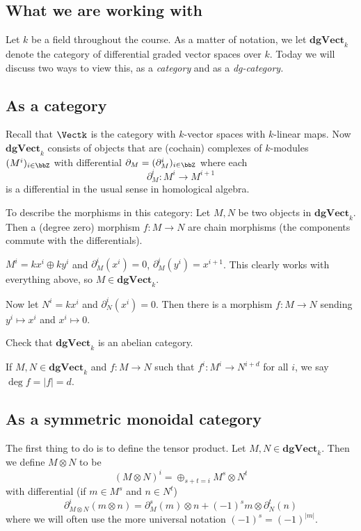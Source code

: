 \documentclass[12pt]{article}
\newcommand*{\dgVectk}{\mathbf{dgVect}_k}
\begin{document}
\subsection{What we are working with}
Let $k$ be a field throughout the course. As a matter of notation, we let $\dgVectk$
denote the category of differential graded vector spaces over $k$. Today we will discuss two ways to
view this, as a \textit{category} and as a \textit{dg-category.}

\subsection{As a category}
Recall that $\Vectk$ is the category with $k$-vector spaces with $k$-linear maps. Now $\dgVectk$ consists of
objects that are (cochain) complexes of $k$-modules $(M^i)_{i\in\bbZ}$ with differential
$\partial_M=(\partial_M^i)_{i\in\bbZ}$ where each 
\[\partial_M^i:M^i\to M^{i+1}\]
is a differential in the usual sense in homological algebra.

To describe the morphisms in this category: Let $M,N$ be two objects in $\dgVectk$. Then 
a (degree zero) morphism $f:M\to N$ are chain morphisms (the components commute with the differentials).

\begin{ex}
	$M^i=kx^i\oplus ky^i$ and $\partial_M^i(x^i)=0$, $\partial_M^i(y^i)=x^{i+1}$. This clearly
	works with everything above, so $M\in\dgVectk$.

	Now let $N^i=kx^i$ and $\partial_N^i(x^i)=0$. Then there is a morphism $f:M\to N$ sending $y^i\mapsto x^i$ and $x^i\mapsto 0$.
\end{ex}

\begin{prob}
	Check that $\dgVectk$ is an abelian category.
\end{prob}

\begin{defn}
	If $M,N\in \dgVectk$ and $f:M\to N$ such that $f^i:M^i\to N^{i+d}$ for all $i$, 
	we say $\deg f=|f|=d$.
\end{defn}

\subsection{As a symmetric monoidal category}
The first thing to do is to define the tensor product. Let $M,N\in \dgVectk$. Then we define
$M\otimes N$ to be
\[(M\otimes N)^i=\oplus_{s+t=i} M^s\otimes N^t\]
with differential (if $m\in M^s$ and $n\in N^t$)
\[\partial_{M\otimes N}^i(m\otimes n)=\partial_M^s(m)\otimes n+(-1)^sm\otimes \partial_N^t(n)\]
where we will often use the more universal notation $(-1)^s=(-1)^{|m|}$.
\end{document}
